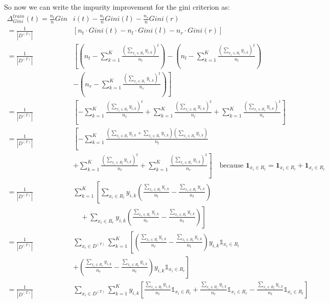 \documentclass{article}
\begin{document}
So now we can write the impurity improvement for the gini criterion as: 
\begin{align*}
    \Delta_{Gini}^{train}(t) = \frac{n_t}{n} Gin&i(t) - \frac{n_l}{n}Gini(l) - \frac{n_r}{n}Gini(r) \\
    = \frac{1}{|D^{(T)}|} &\left[ n_t \cdot Gini(t) - n_l \cdot Gini(l) - n_r \cdot Gini(r) \right] \\
    = \frac{1}{|D^{(T)}|} & \left[ \left(n_t - \sum_{k=1}^K\frac{\left(\sum_{x_i \in R_t} y_{i,k}\right)^2}{n_t} \right) \right. - \left( n_l - \sum_{k=1}^K \frac{ \left( \sum_{x_i \in R_l} y_{i,k} \right) ^2}{n_l} \right)\\
    & \left.  - \left( n_r - \sum_{k=1}^K \frac{\left(\sum_{x_i \in R_r} y_{i,k}\right)^2}{n_r} \right) \right] \\
    = \frac{1}{|D^{(T)}|} &\left[- \sum_{k=1}^K\frac{\left(\sum_{x_i \in R_t} y_{i,k}\right)^2}{n_t} +  \sum_{k=1}^K \frac{\left(\sum_{x_i \in R_l} y_{i,k}\right)^2}{n_l} + \sum_{k=1}^K \frac{\left(\sum_{x_i \in R_r} y_{i,k}\right)^2}{n_r} \right] \\
    = \frac{1}{|D^{(T)}|} &\left[- \sum_{k=1}^K\frac{\left(\sum_{x_i \in R_l} y_{i,k} + \sum_{x_i \in R_r} y_{i,k}\right)\left(\sum_{x_i \in R_t} y_{i,k}\right)}{n_t} \right. \\
    & \left.+  \sum_{k=1}^K \frac{\left(\sum_{x_i \in R_l} y_{i,k}\right)^2}{n_l} + \sum_{k=1}^K \frac{\left(\sum_{x_i \in R_r} y_{i,k}\right)^2}{n_r} \right] \quad \text{because } \textbf{1}_{x_i \in R_t} = \textbf{1}_{x_i \in R_l} + \textbf{1}_{x_i \in R_r}\\
    = \frac{1}{|D^{(T)}|} &\sum_{k=1}^K \left[ \sum_{x_i \in R_l} y_{i,k} \left( \frac{\sum_{x_i \in R_l} y_{i,k}}{n_l} - \frac{\sum_{x_i \in R_t} y_{i,k}}{n_t} \right) \right. \\
    & \left. \quad + \sum_{x_i \in R_r} y_{i,k} \left( \frac{\sum_{x_i \in R_r} y_{i,k}}{n_r} - \frac{\sum_{x_i \in R_t} y_{i,k}}{n_t} \right)  \right] \\
    = \frac{1}{|D^{(T)}|} &\sum_{x_i \in D^{(T)}} \sum_{k=1}^K \left[ \left(\frac{\sum_{x_i \in R_l} y_{i,k}}{n_l} - \frac{\sum_{x_i \in R_t} y_{i,k}}{n_t}\right) y_{i,k}\mathds{1}_{x_i \in R_l} \right. \\
    & \left. + \left(\frac{\sum_{x_i \in R_r} y_{i,k}}{n_r} - \frac{\sum_{x_i \in R_t} y_{i,k}}{n_t}\right) y_{i,k}\mathds{1}_{x_i \in R_r} \right] \\
    =  \frac{1}{|D^{(T)}|} &\sum_{x_i \in D^{(T)}} \sum_{k=1}^K y_{i,k} \left[ \frac{\sum_{x_i \in R_l} y_{i,k}}{n_l} \mathds{1}_{x_i \in R_l} + \frac{\sum_{x_i \in R_r} y_{i,k}}{n_r} \mathds{1}_{x_i \in R_r} - \frac{\sum_{x_i \in R_t} y_{i,k}}{n_t} \mathds{1}_{x_i \in R_t} \right]
\end{align*}
\end{document}
